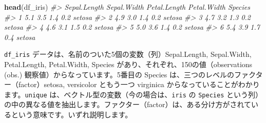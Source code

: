 \documentclass[
  xelatex, ja=standard]{bxjsbook}
\newenvironment{Shaded}{\begin{snugshade}}{\end{snugshade}}
\newcommand{\CommentTok}[1]{\textcolor[rgb]{0.56,0.35,0.01}{\textit{#1}}}
\newcommand{\FunctionTok}[1]{\textcolor[rgb]{0.13,0.29,0.53}{\textbf{#1}}}
\newcommand{\NormalTok}[1]{#1}
\newcommand{\SpecialCharTok}[1]{\textcolor[rgb]{0.81,0.36,0.00}{\textbf{#1}}}
\theoremstyle{definition}
\theoremstyle{definition}
\theoremstyle{definition}
\theoremstyle{definition}
\theoremstyle{remark}
\begin{document}
\begin{Shaded}
\begin{Highlighting}[]
\FunctionTok{head}\NormalTok{(df\_iris)}
\CommentTok{\#\textgreater{}   Sepal.Length Sepal.Width Petal.Length Petal.Width Species}
\CommentTok{\#\textgreater{} 1          5.1         3.5          1.4         0.2  setosa}
\CommentTok{\#\textgreater{} 2          4.9         3.0          1.4         0.2  setosa}
\CommentTok{\#\textgreater{} 3          4.7         3.2          1.3         0.2  setosa}
\CommentTok{\#\textgreater{} 4          4.6         3.1          1.5         0.2  setosa}
\CommentTok{\#\textgreater{} 5          5.0         3.6          1.4         0.2  setosa}
\CommentTok{\#\textgreater{} 6          5.4         3.9          1.7         0.4  setosa}
\end{Highlighting}
\end{Shaded}

\begin{Shaded}
\end{Shaded}

\texttt{df\_iris} データは、名前のついた5個の変数（列）Sepal.Length, Sepal.Width, Petal.Length, Petal.Width, Species があり、それぞれ、150の値（observations (obs.) 観察値）からなっています。5番目の Species は、三つのレベルのファクター（factor）setosa, versicolor ともう一つ virginica からなっていることがわかります。\texttt{unique} は、ベクトル型の変数（今の場合は、\texttt{iris} の \texttt{Species} という列）の中の異なる値を抽出します。ファクター（factor）は、ある分け方がされているという意味です。いずれ説明します。

\begin{Shaded}
\end{Shaded}
\end{document}

